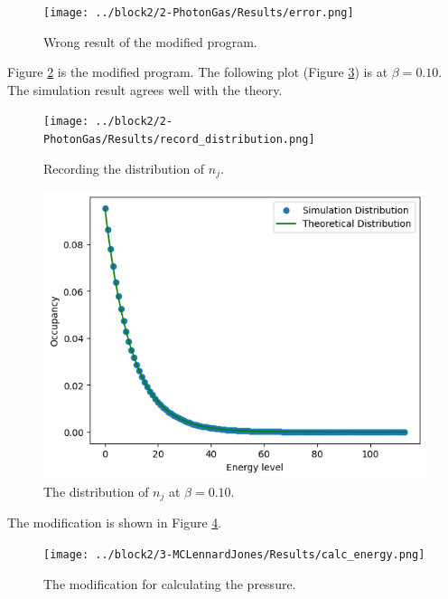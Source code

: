 \documentclass{assignmeownt}
\begin{document}
\begin{figure}
    \centering
    \texttt{[image: ../block2/2-PhotonGas/Results/error.png]}
    \caption{Wrong result of the modified program.}
    \label{fig:modify_photon_result}
\end{figure}


Figure \ref{fig:record_distribution_of_nj} is the modified program. The following plot (Figure \ref{fig:distribution_of_nj}) is at $\beta=0.10$. The simulation result agrees well with the theory.

\begin{figure}
    \centering
    \texttt{[image: ../block2/2-PhotonGas/Results/record\_distribution.png]}
    \caption{Recording the distribution of $n_j$.}
    \label{fig:record_distribution_of_nj}
\end{figure}

\begin{figure}
    \centering
    \includegraphics[width=0.5\linewidth]{../block2/2-PhotonGas/Results/distribution.png}
    \caption{The distribution of $n_j$ at $\beta=0.10$.}
    \label{fig:distribution_of_nj}
\end{figure}

\bigskip


The modification is shown in Figure \ref{fig:energy_md}.

\begin{figure}
    \centering
    \texttt{[image: ../block2/3-MCLennardJones/Results/calc\_energy.png]}
    \caption{The modification for calculating the pressure.}
    \label{fig:energy_md}
\end{figure}
\end{document}
